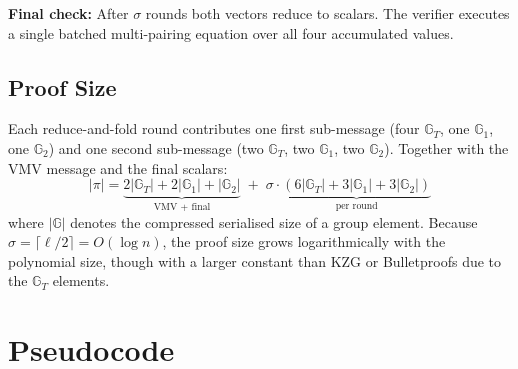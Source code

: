 \textbf{Final check:} After $\sigma$ rounds both vectors reduce to scalars.
The verifier executes a single batched multi-pairing equation over all four
accumulated values.

\subsection{Proof Size}

Each reduce-and-fold round contributes one first sub-message
(four $\mathbb{G}_T$, one $\mathbb{G}_1$, one $\mathbb{G}_2$) and one second
sub-message (two $\mathbb{G}_T$, two $\mathbb{G}_1$, two $\mathbb{G}_2$).
Together with the VMV message and the final scalars:
\begin{equation}
    |\pi| =
    \underbrace{2|\mathbb{G}_T| + 2|\mathbb{G}_1| + |\mathbb{G}_2|}_{\text{VMV + final}}
    \;+\;
    \sigma \cdot
    \underbrace{(6|\mathbb{G}_T| + 3|\mathbb{G}_1| + 3|\mathbb{G}_2|)}_{\text{per round}}
\end{equation}
where $|\mathbb{G}|$ denotes the compressed serialised size of a group
element. Because $\sigma = \lceil\ell/2\rceil = O(\log n)$, the proof size
grows logarithmically with the polynomial size, though with a larger constant
than KZG or Bulletproofs due to the $\mathbb{G}_T$ elements.

\section{Pseudocode}

